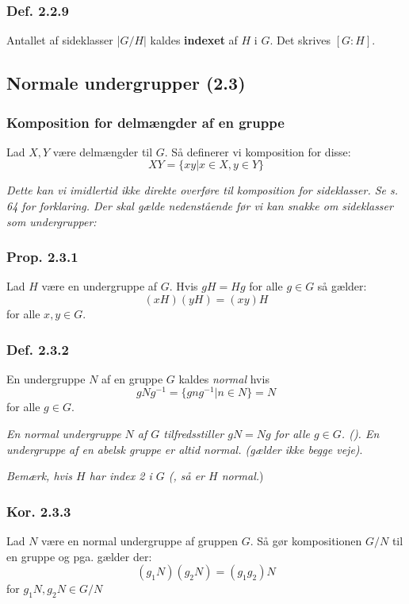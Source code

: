 \subsubsection{Def. 2.2.9}
\label{2.2.9}
Antallet af sideklasser |$G/H|$ kaldes \textbf{indexet} af $H$ i $G$. Det skrives $[G :
H]$.

\subsection{Normale undergrupper (2.3)}
\subsubsection{Komposition for delmængder af en gruppe}
\label{Komp_for_subsets}
Lad $X, Y$ være delmængder til $G$. Så definerer vi komposition for disse:
\begin{equation*}
  XY = \{xy|x \in X, y \in Y\}
\end{equation*}

\textit{Dette kan vi imidlertid ikke direkte overføre til komposition for sideklasser.
Se s. 64 for forklaring. Der skal gælde nedenstående før vi kan snakke om
sideklasser som undergrupper:}

\subsubsection{Prop. 2.3.1}
\label{2.3.1}
Lad $H$ være en undergruppe af $G$. Hvis $gH = Hg$ for alle $g \in G$ så gælder:
\begin{equation*}
  (xH)(yH) = (xy)H
\end{equation*}
for alle $x, y \in G$.

\subsubsection{Def. 2.3.2}
\label{2.3.2}
En undergruppe $N$ af en gruppe $G$ kaldes \textit{normal} hvis
\begin{equation*}
  gNg^{-1} = \{gng^{-1}| n \in N\} = N
\end{equation*}
for alle $g \in G$.

\textit{En normal undergruppe $N$ af $G$ tilfredsstiller $gN = Ng$ for alle $g
\in G$. (). En undergruppe af en abelsk gruppe er altid normal.
(gælder ikke begge veje)}.

\textit{Bemærk, hvis $H$ har index 2 i $G$ (, så er $H$ normal.})

\subsubsection{Kor. 2.3.3}
Lad $N$ være en normal undergruppe af gruppen $G$. Så gør kompositionen
 $G/N$ til en gruppe og pga.  gælder der: 
\begin{equation*}
  (g_1 N)(g_2 N) = (g_1 g_2) N
\end{equation*}
for $g_1 N, g_2 N \in G/N$

